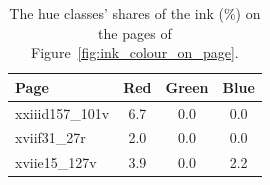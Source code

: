 \begin{table}[htbp]
  \centering
  \caption{The hue classes' shares of the ink (\%) on the pages of Figure~\ref{fig:ink_colour_on_page}.}
  \label{tab:ink_colour_on_page}
  \begin{tabular}{lccc}
    \toprule
    Page & Red & Green & Blue \\
    \midrule
    xxiiid157\_101v & 6.7 & 0.0 & 0.0 \\
    xviif31\_27r & 2.0 & 0.0 & 0.0 \\
    xviie15\_127v & 3.9 & 0.0 & 2.2 \\
    \bottomrule
  \end{tabular}
\end{table}
